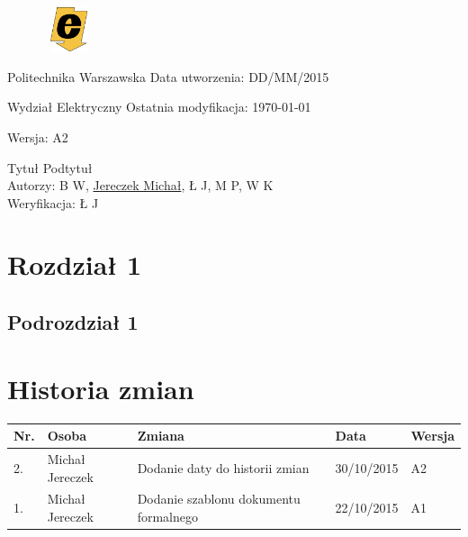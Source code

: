 \documentclass[a4paper, 12pt]{article}
\begin{document}
\begin{figure}
\includegraphics[width=1.5cm,height=1.3cm,keepaspectratio]{ee.png}
\end{figure}

Politechnika Warszawska 
\hfill Data utworzenia: DD/MM/2015

Wydział Elektryczny
\hfill Ostatnia modyfikacja: \today

\hfill Wersja: A2

\quad
\begin{center}
\center \Huge Tytuł
\center \large Podtytuł
\vspace{0.5cm}\\
\small Autorzy: B W, \underline{Jereczek Michał}, Ł J, M P, W K
\vspace{0.1cm}\\
\small Weryfikacja: Ł J
\end{center}

\tableofcontents
\pagebreak

\section{Rozdział 1}
\subsection{Podrozdział 1}

\pagebreak
\section{Historia zmian}
\begin{center}
    \begin{tabular}{ | p{0.5cm} | p{4.5cm} | p{6cm} | p{2cm} |p{1.2cm} |}
    \hline
    Nr. & Osoba & Zmiana & Data & Wersja 
    \\ \hline
    2. & Michał Jereczek & Dodanie daty do historii zmian & 30/10/2015  & A2
    \\ \hline
    1. & Michał Jereczek & Dodanie szablonu dokumentu formalnego & 22/10/2015  & A1
    \\ \hline
    \end{tabular}
\end{center}
\end{document}
